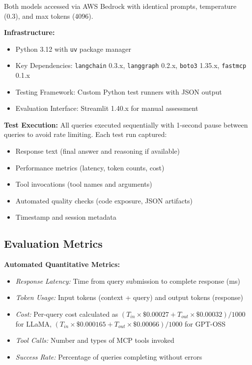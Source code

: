 \documentclass{article}
\begin{document}
Both models accessed via AWS Bedrock with identical prompts, temperature (0.3), and max tokens (4096).

\textbf{Infrastructure:}
\begin{itemize}
    \item Python 3.12 with \texttt{uv} package manager
    \item Key Dependencies: \texttt{langchain} 0.3.x, \texttt{langgraph} 0.2.x, \texttt{boto3} 1.35.x, \texttt{fastmcp} 0.1.x
    \item Testing Framework: Custom Python test runners with JSON output
    \item Evaluation Interface: Streamlit 1.40.x for manual assessment
\end{itemize}

\textbf{Test Execution:} All queries executed sequentially with 1-second pause between queries to avoid rate limiting. Each test run captured:
\begin{itemize}
    \item Response text (final answer and reasoning if available)
    \item Performance metrics (latency, token counts, cost)
    \item Tool invocations (tool names and arguments)
    \item Automated quality checks (code exposure, JSON artifacts)
    \item Timestamp and session metadata
\end{itemize}

\subsection{Evaluation Metrics}

\textbf{Automated Quantitative Metrics:}

\begin{itemize}
    \item \textit{Response Latency:} Time from query submission to complete response (ms)
    \item \textit{Token Usage:} Input tokens (context + query) and output tokens (response)
    \item \textit{Cost:} Per-query cost calculated as $(T_{in} \times \$0.00027 + T_{out} \times \$0.00032) / 1000$ for LLaMA, $(T_{in} \times \$0.000165 + T_{out} \times \$0.00066) / 1000$ for GPT-OSS
    \item \textit{Tool Calls:} Number and types of MCP tools invoked
    \item \textit{Success Rate:} Percentage of queries completing without errors
\end{itemize}
\end{document}
